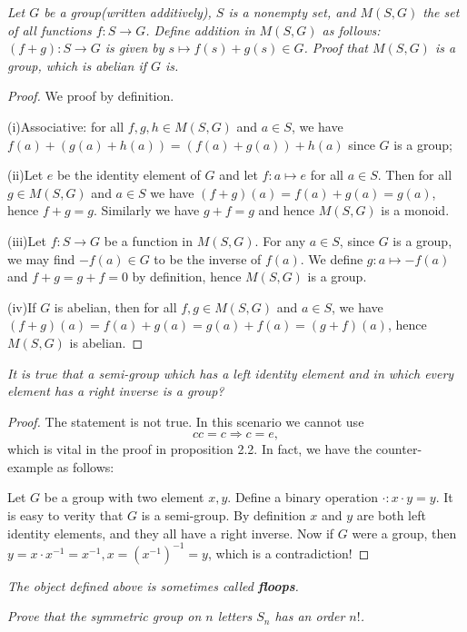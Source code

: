 \begin{problem}\em
Let $G$ be a group(written additively), $S$ is a nonempty set, and $M(S,G)$ the set of all functions $f:S\to G$. Define addition in $M(S,G)$ as follows:$(f+g):S\to G$ is given by $s\mapsto f(s)+g(s)\in G$. Proof that $M(S,G)$ is a group, which is abelian if $G$ is.
\end{problem}
\begin{proof}
We proof by definition.\par
(i)Associative: for all $f,g,h\in M(S,G)$ and $a\in S$, we have $f(a)+(g(a)+h(a))=(f(a)+g(a))+h(a)$ since $G$ is a group;\par
(ii)Let $e$ be the identity element of $G$ and let $f:a\mapsto e$ for all $a\in S$. Then for all $g\in M(S,G)$ and $a\in S$ we have $(f+g)(a)=f(a)+g(a)=g(a)$, hence $f+g=g$. Similarly we have $g+f=g$ and hence $M(S,G)$ is a monoid.\par
(iii)Let $f:S\to G$ be a function in $M(S,G)$. For any $a\in S$, since $G$ is a group, we may find $-f(a)\in G$ to be the inverse of $f(a)$. We define $g:a\mapsto -f(a)$ and $f+g=g+f=0$ by definition, hence $M(S,G)$ is a group.\par
(iv)If $G$ is abelian, then for all $f,g\in M(S,G)$ and $a\in S$, we have $(f+g)(a)=f(a)+g(a)=g(a)+f(a)=(g+f)(a)$, hence $M(S,G)$ is abelian.
\end{proof}
\begin{problem}\em
It is true that a semi-group which has a left identity element and in which every element has a right inverse is a group?
\end{problem}
\begin{proof}
The statement is not true. In this scenario we cannot use 
$$cc=c\Rightarrow c=e,$$
which is vital in the proof in proposition 2.2. In fact, we have the counter-example as follows:\par
Let $G$ be a group with two element $x,y$. Define a binary operation $\cdot:x\cdot y=y$. It is easy to verity that $G$ is a semi-group. By definition $x$ and $y$ are both left identity elements, and they all have a right inverse. Now if $G$ were a group, then $y=x\cdot x^{-1}=x^{-1},x=(x^{-1})^{-1}=y$, which is a contradiction!
\end{proof}
\begin{note}\em
The object defined above is sometimes called \textbf{floops}.
\end{note}
\begin{problem}\em
Prove that the symmetric group on $n$ letters $S_n$ has an order $n!$.
\end{problem}
